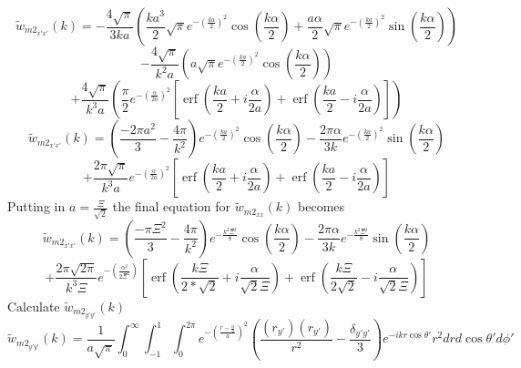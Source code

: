 \documentclass[double,12pt]{beavtex}
\begin{document}
\[{}\]
\begin{displaymath}{\widetilde{w}_{{m2}_{x'x'}}(k)=-\frac{4\sqrt{\pi}}{3ka}\left(\frac{ka^3}{2}\sqrt{\pi}e^{-\left(\frac{ka}{2}\right)^2}\cos(\frac{k\alpha}{2})+\frac{a\alpha}{2}\sqrt{\pi}e^{-\left(\frac{ka}{2}\right)^2}\sin(\frac{k\alpha}{2})\right)}\end{displaymath} 
\begin{displaymath}{-\frac{4\sqrt{\pi}}{k^2a}\left(a\sqrt{\pi}e^{-\left(\frac{ka}{2}\right)^2}\cos(\frac{k\alpha}{2})\right)}\end{displaymath} 
\begin{equation}{+\frac{4\sqrt{\pi}}{k^3a}\left(\frac{\pi}{2}e^{-\left(\frac{\alpha}{2a}\right)^2}\left[\operatorname{erf}\left(\frac{ka}{2}+i\frac{\alpha}{2a}\right)+\operatorname{erf}\left(\frac{ka}{2}-i\frac{\alpha}{2a}\right)\right]\right)}\end{equation} 
\[{}\]
\begin{displaymath}{\widetilde{w}_{{m2}_{x'x'}}(k)=\left(\frac{-2\pi{a}^2}{3}-\frac{4\pi}{k^2}\right)e^{-\left(\frac{ka}{2}\right)^2}\cos(\frac{k\alpha}{2})-\frac{2\pi\alpha}{3k}e^{-\left(\frac{ka}{2}\right)^2}\sin(\frac{k\alpha}{2})}\end{displaymath} 
\begin{equation}{+\frac{2\pi\sqrt{\pi}}{k^3a}e^{-\left(\frac{\alpha}{2a}\right)^2}\left[\operatorname{erf}\left(\frac{ka}{2}+i\frac{\alpha}{2a}\right)+\operatorname{erf}\left(\frac{ka}{2}-i\frac{\alpha}{2a}\right)\right]}\end{equation} 
Putting in $a=\frac{\Xi}{\sqrt{2}}$ the final equation for $\widetilde{w}_{{m2}_{xx}}(k)$ becomes
\[{}\] \color{green}
\begin{displaymath}{\widetilde{w}_{{m2}_{x'x'}}(k)=\left(\frac{-\pi{\Xi}^2}{3}-\frac{4\pi}{k^2}\right)e^{-\frac{k^2\Xi^2}{8}}\cos(\frac{k\alpha}{2})-\frac{2\pi\alpha}{3k}e^{-\frac{k^2\Xi^2}{8}}\sin(\frac{k\alpha}{2})}\end{displaymath} 
\begin{equation}{+\frac{2\pi\sqrt{2\pi}}{k^3\Xi}e^{-\left(\frac{\alpha^2}{2\Xi^2}\right)}\left[\operatorname{erf}\left(\frac{k\Xi}{2*\sqrt{2}}+i\frac{\alpha}{\sqrt{2}\Xi}\right)+\operatorname{erf}\left(\frac{k\Xi}{2\sqrt{2}}-i\frac{\alpha}{\sqrt{2}\Xi}\right)\right]}\end{equation} 
\color{black}
\[{}\]
Calculate $\widetilde{w}_{{m2}_{y'y'}}(k)$ 
\begin{equation}{\widetilde{w}_{{m2}_{y'y'}}(k)=\frac{1}{a\sqrt{\pi}}\int_{0}^{\infty}\int_{-1}^{1}\int_{0}^{2\pi}e^{-\left(\frac{r-\frac{\alpha}{2}}{a}\right)^2}\left(\frac{(r_{y'})(r_{y'})}{r^2}-\frac{\delta_{y'y'}}{3}\right)e^{-ikr\cos\theta'}r^2d{r}d{\cos\theta'}d{\phi'}}\end{equation}
\end{document}

